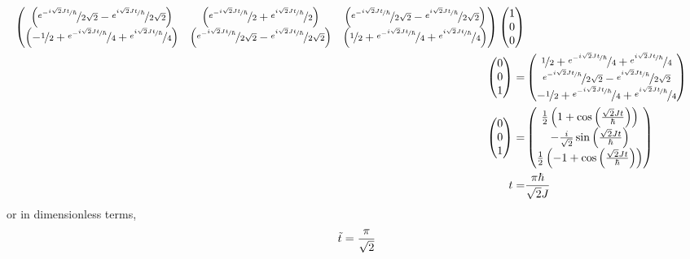 \documentclass[aps]{revtex4-2}
\begin{document}
\begin{align}
\begin{pmatrix}
        \left(\nicefrac{e^{-\nicefrac{i\sqrt{2}Jt}{\hbar}}}{2\sqrt{2}}-\nicefrac{e^{\nicefrac{i\sqrt{2}Jt}{\hbar}}}{2\sqrt{2}}\right)&\left(\nicefrac{e^{-\nicefrac{i\sqrt{2}Jt}{\hbar}}}{2}+\nicefrac{e^{\nicefrac{i\sqrt{2}Jt}{\hbar}}}{2}\right)&\left(\nicefrac{e^{-\nicefrac{i\sqrt{2}Jt}{\hbar}}}{2\sqrt{2}}-\nicefrac{e^{\nicefrac{i\sqrt{2}Jt}{\hbar}}}{2\sqrt{2}}\right)\\
        \left(-\nicefrac{1}{2}+\nicefrac{e^{-\nicefrac{i\sqrt{2}Jt}{\hbar}}}{4}+\nicefrac{e^{\nicefrac{i\sqrt{2}Jt}{\hbar}}}{4}\right)&\left(\nicefrac{e^{-\nicefrac{i\sqrt{2}Jt}{\hbar}}}{2\sqrt{2}}-\nicefrac{e^{\nicefrac{i\sqrt{2}Jt}{\hbar}}}{2\sqrt{2}}\right)&\left(\nicefrac{1}{2}+\nicefrac{e^{-\nicefrac{i\sqrt{2}Jt}{\hbar}}}{4}+\nicefrac{e^{\nicefrac{i\sqrt{2}Jt}{\hbar}}}{4}\right)
    \end{pmatrix}\begin{pmatrix}
        1\\
        0\\
        0
    \end{pmatrix}\nonumber\\
    \begin{pmatrix}
        0\\
        0\\
        1
    \end{pmatrix}=&\begin{pmatrix}
        \nicefrac{1}{2}+\nicefrac{e^{-\nicefrac{i\sqrt{2}Jt}{\hbar}}}{4}+\nicefrac{e^{\nicefrac{i\sqrt{2}Jt}{\hbar}}}{4}\\
        \nicefrac{e^{-\nicefrac{i\sqrt{2}Jt}{\hbar}}}{2\sqrt{2}}-\nicefrac{e^{\nicefrac{i\sqrt{2}Jt}{\hbar}}}{2\sqrt{2}}\\
        -\nicefrac{1}{2}+\nicefrac{e^{-\nicefrac{i\sqrt{2}Jt}{\hbar}}}{4}+\nicefrac{e^{\nicefrac{i\sqrt{2}Jt}{\hbar}}}{4}
    \end{pmatrix}\nonumber\\
    \begin{pmatrix}
        0\\
        0\\
        1
    \end{pmatrix}=&\begin{pmatrix}
        \frac{1}{2} \left( 1 + \cos \left( \frac{\sqrt{2} J t}{\hbar} \right) \right) \\
        -\frac{i}{\sqrt{2}} \sin \left( \frac{\sqrt{2} J t}{\hbar} \right) \\
        \frac{1}{2} \left( -1 + \cos \left( \frac{\sqrt{2} J t}{\hbar} \right) \right)
    \end{pmatrix}\nonumber\\
    t=&\frac{\pi\hbar}{\sqrt{2}J}
\end{align}
or in dimensionless terms,
\begin{equation}
    \Tilde{t}=\frac{\pi}{\sqrt{2}}
\end{equation}
\end{document}
